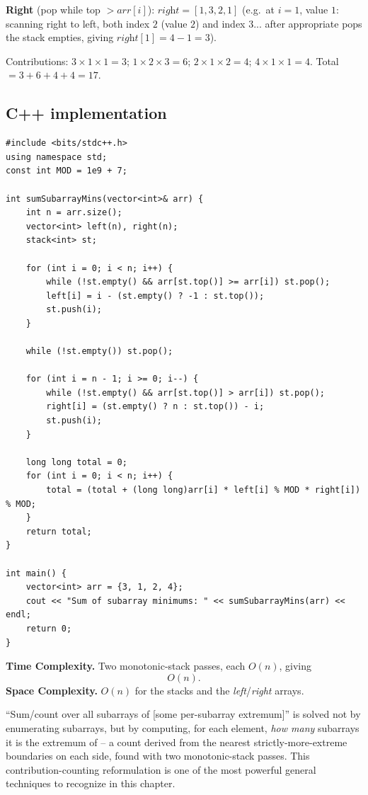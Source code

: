 \textbf{Right} (pop while top $> \textit{arr}[i]$): $\textit{right} =
[1,3,2,1]$ (e.g.\ at $i=1$, value $1$: scanning right to left, both
index $2$ (value $2$) and index $3$... after appropriate pops the stack
empties, giving $\textit{right}[1]=4-1=3$).

Contributions: $3 \times 1 \times 1=3$; $1\times2\times3=6$;
$2\times1\times2=4$; $4\times1\times1=4$. Total $=3+6+4+4=17$.

\subsection*{C++ implementation}

\begin{lstlisting}
#include <bits/stdc++.h>
using namespace std;
const int MOD = 1e9 + 7;

int sumSubarrayMins(vector<int>& arr) {
    int n = arr.size();
    vector<int> left(n), right(n);
    stack<int> st;

    for (int i = 0; i < n; i++) {
        while (!st.empty() && arr[st.top()] >= arr[i]) st.pop();
        left[i] = i - (st.empty() ? -1 : st.top());
        st.push(i);
    }

    while (!st.empty()) st.pop();

    for (int i = n - 1; i >= 0; i--) {
        while (!st.empty() && arr[st.top()] > arr[i]) st.pop();
        right[i] = (st.empty() ? n : st.top()) - i;
        st.push(i);
    }

    long long total = 0;
    for (int i = 0; i < n; i++) {
        total = (total + (long long)arr[i] * left[i] % MOD * right[i]) % MOD;
    }
    return total;
}

int main() {
    vector<int> arr = {3, 1, 2, 4};
    cout << "Sum of subarray minimums: " << sumSubarrayMins(arr) << endl;
    return 0;
}
\end{lstlisting}

\begin{complexitybox}
\textbf{Time Complexity.} Two monotonic-stack passes, each $O(n)$, giving
\[
  O(n).
\]
\textbf{Space Complexity.} $O(n)$ for the stacks and the
\textit{left}/\textit{right} arrays.
\end{complexitybox}

\begin{takeawaybox}
``Sum/count over all subarrays of [some per-subarray extremum]'' is
solved not by enumerating subarrays, but by computing, for each element,
\emph{how many} subarrays it is the extremum of -- a count derived from
the nearest strictly-more-extreme boundaries on each side, found with two
monotonic-stack passes. This contribution-counting reformulation is one
of the most powerful general techniques to recognize in this chapter.
\end{takeawaybox}
